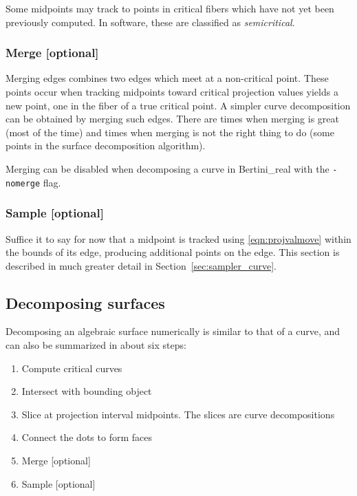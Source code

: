 Some midpoints may track to points in critical fibers which have not yet been previously computed.  In software, these are classified as {\em semicritical}.

\subsubsection{Merge [optional]}

Merging edges combines two edges which meet at a non-critical point.  These points occur when tracking midpoints toward critical projection values yields a new point, one in the fiber of a true critical point.  A simpler curve decomposition can be obtained by merging such edges.  There are times when merging is great (most of the time) and times when merging is not the right thing to do (some points in the surface decomposition algorithm).

Merging can be disabled when decomposing a curve in Bertini\_real with the {\tt -nomerge} flag.


\subsubsection{Sample [optional]}
Suffice it to say for now that a midpoint is tracked using \eqref{eqn:projvalmove} within the bounds of its edge, producing additional points on the edge.  
This section is described in much greater detail in Section~\ref{sec:sampler_curve}.   



















\subsection{Decomposing surfaces}
\label{sec:algo_surface}


Decomposing an algebraic surface numerically is similar to that of a curve, and can also be summarized in about six steps:
%
\begin{enumerate}[noitemsep]
\item Compute critical curves
\item Intersect with bounding object
\item Slice at projection interval midpoints.  The slices are curve decompositions
\item Connect the dots to form faces
\item Merge [optional]
\item Sample [optional]
\end{enumerate}


